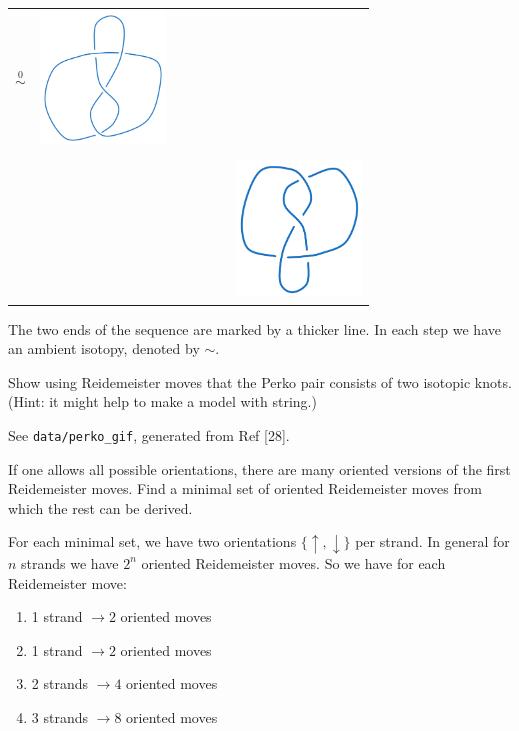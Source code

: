 \documentclass[10pt]{article}
\begin{document}
\begin{center}
\begin{tabular}{ m{9em} c m{9em} c m{9em} c m{9em} }
		$\overset{\text{0}}{\sim}$&
		\includegraphics[width=9em]{figs/b2e125_12.png}\\
		&&&&&&\rotatebox[origin=c]{90}{$\sim$}\text{\scriptsize{0}}\\
		&&&&&&\includegraphics[width=9em]{figs/b2e125_13.png}
	\end{tabular}
\end{center}
The two ends of the sequence are marked by a thicker line. In each step we have an ambient isotopy, denoted by $\sim$.

\begin{example}
	Show using Reidemeister moves that the Perko pair consists of two isotopic knots. (Hint: it might help to make a model with string.)
\end{example}
\sol See {\tt data/perko{\_}gif}, generated from Ref [28].


\begin{example}
	If one allows all possible orientations, there are many oriented versions of the first Reidemeister moves. Find a minimal set of oriented Reidemeister moves from which the rest can be derived.
\end{example}
\sol For each minimal set, we have two orientations $\{\uparrow, \downarrow\}$ per strand. In general for $n$ strands we have $2^n$ oriented Reidemeister moves. So we have for each Reidemeister move:
\begin{enumerate}[label=Move \arabic*:, start=0]
	\item 1 strand $\to 2$ oriented moves
	\item 1 strand $\to 2$ oriented moves
	\item 2 strands $\to 4$ oriented moves
	\item 3 strands $\to 8$ oriented moves
\end{enumerate}
\end{document}

